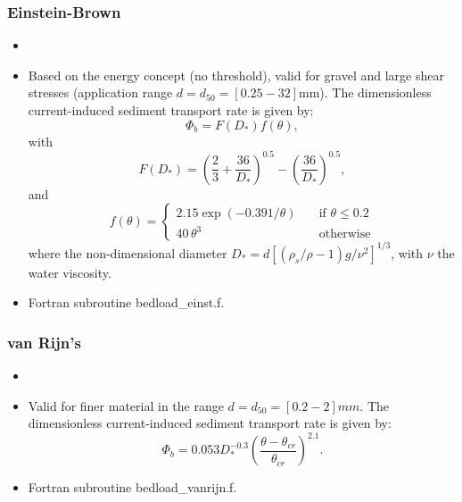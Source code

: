 \subsubsection{Einstein-Brown}
\begin{itemize}
\item {}
\item Based on the energy concept (no threshold), valid for gravel and large shear
stresses (application range $d=d_{50} = [0.25-32]$mm). The dimensionless current-induced sediment transport rate is given by:
\begin{equation*}
\Phi_b = F(D_*)f(\theta), 
\end{equation*}
with
\begin{equation*}\label{eq:EinsteinFDs}
F(D_*) = \left(\frac{2}{3} +\frac{36}{D_*}\right)^{0.5} - \left( \frac{36}{D_*}\right)^{0.5}, 
\end{equation*}
and
\begin{equation*}
f(\theta)=\left\{\begin{array}{ll}
2.15\exp(-0.391/\theta) & \quad\text{if}\,\,\theta \leq 0.2 \\
40\,\theta^{3}          & \quad\text{otherwise}
\end{array}
\right.
\end{equation*}
where the non-dimensional diameter $D_*=d[(\rho_s/\rho-1)g/\nu^2]^{1/3}$, with $\nu$ the water viscosity.
\item Fortran subroutine {\ttfamily bedload\_einst.f}.
\end{itemize}

\subsubsection{van Rijn's}
\begin{itemize}
\item {}
\item Valid for finer material in the range $d = d_{50} = [0.2-2]mm$. The dimensionless current-induced sediment transport rate is given by:
\begin{equation*}
\Phi_b = 0.053 D_*^{-0.3} \left( \frac{\theta-\theta_{cr}}{\theta_{cr}} \right)^{2.1}.
\end{equation*}

\item Fortran subroutine {\ttfamily bedload\_vanrijn.f}.
\end{itemize}

